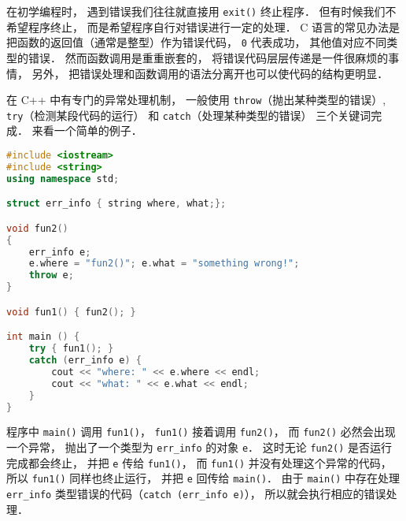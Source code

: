 
\begin{issues}
\issueMissDepend
\end{issues}

在初学编程时， 遇到错误我们往往就直接用 \verb|exit()| 终止程序． 但有时候我们不希望程序终止， 而是希望程序自行对错误进行一定的处理． C 语言的常见办法是把函数的返回值（通常是整型）作为错误代码， \verb|0| 代表成功， 其他值对应不同类型的错误． 然而函数调用是重重嵌套的， 将错误代码层层传递是一件很麻烦的事情， 另外， 把错误处理和函数调用的语法分离开也可以使代码的结构更明显．

在 C++ 中有专门的异常处理机制， 一般使用 \verb|throw|（抛出某种类型的错误）, \verb|try|（检测某段代码的运行） 和 \verb|catch|（处理某种类型的错误） 三个关键词完成． 来看一个简单的例子．

\begin{lstlisting}[language=cpp]
#include <iostream>
#include <string>
using namespace std;

struct err_info { string where, what;};

void fun2()
{
	err_info e;
	e.where = "fun2()"; e.what = "something wrong!";
	throw e;
}

void fun1() { fun2(); }

int main () {
	try { fun1(); }
	catch (err_info e) {
		cout << "where: " << e.where << endl;
		cout << "what: " << e.what << endl; 
	}
}
\end{lstlisting}
程序中 \verb|main()| 调用 \verb|fun1()|， \verb|fun1()| 接着调用 \verb|fun2()|， 而 \verb|fun2()| 必然会出现一个异常， 抛出了一个类型为 \verb|err_info| 的对象 \verb|e|． 这时无论 \verb|fun2()| 是否运行完成都会终止， 并把 \verb|e| 传给 \verb|fun1()|， 而 \verb|fun1()| 并没有处理这个异常的代码， 所以 \verb|fun1()| 同样也终止运行， 并把 \verb|e| 回传给 \verb|main()|． 由于 \verb|main()| 中存在处理 \verb|err_info| 类型错误的代码（\verb|catch (err_info e)|）， 所以就会执行相应的错误处理．
